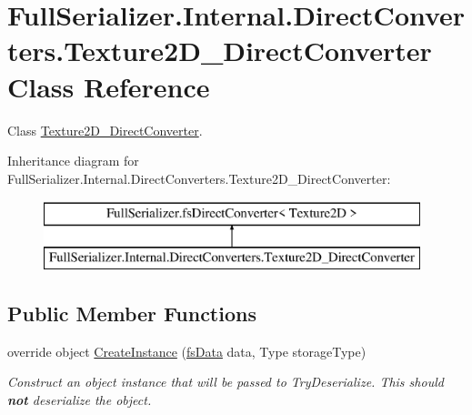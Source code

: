\hypertarget{class_full_serializer_1_1_internal_1_1_direct_converters_1_1_texture2_d___direct_converter}{}\section{Full\+Serializer.\+Internal.\+Direct\+Converters.\+Texture2\+D\+\_\+\+Direct\+Converter Class Reference}
\label{class_full_serializer_1_1_internal_1_1_direct_converters_1_1_texture2_d___direct_converter}


Class \hyperlink{class_full_serializer_1_1_internal_1_1_direct_converters_1_1_texture2_d___direct_converter}{Texture2\+D\+\_\+\+Direct\+Converter}.  


Inheritance diagram for Full\+Serializer.\+Internal.\+Direct\+Converters.\+Texture2\+D\+\_\+\+Direct\+Converter\+:\begin{figure}[H]
\begin{center}
\leavevmode
\includegraphics[height=2.000000cm]{class_full_serializer_1_1_internal_1_1_direct_converters_1_1_texture2_d___direct_converter}
\end{center}
\end{figure}
\subsection*{Public Member Functions}
\begin{DoxyCompactItemize}
\item 
override object \hyperlink{class_full_serializer_1_1_internal_1_1_direct_converters_1_1_texture2_d___direct_converter_aa8e980d9c61e0de1f8b49fd8075d701b}{Create\+Instance} (\hyperlink{class_full_serializer_1_1fs_data}{fs\+Data} data, Type storage\+Type)
\begin{DoxyCompactList}\small\item\em Construct an object instance that will be passed to Try\+Deserialize. This should {\bfseries not} deserialize the object. \end{DoxyCompactList}\end{DoxyCompactItemize}
